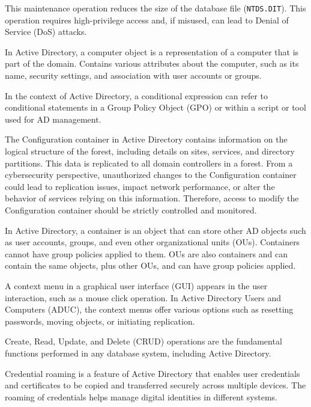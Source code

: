  This maintenance operation reduces the size of the database file (\texttt{NTDS.DIT}). This operation requires high-privilege access and, if misused, can lead to Denial of Service (DoS) attacks.

 In Active Directory, a computer object is a representation of a computer that is part of the domain. Contains various attributes about the computer, such as its name, security settings, and association with user accounts or groups.

 In the context of Active Directory, a conditional expression can refer to conditional statements in a Group Policy Object (GPO) or within a script or tool used for AD management.

 The Configuration container in Active Directory contains information on the logical structure of the forest, including details on sites, services, and directory partitions. This data is replicated to all domain controllers in a forest. From a cybersecurity perspective, unauthorized changes to the Configuration container could lead to replication issues, impact network performance, or alter the behavior of services relying on this information. Therefore, access to modify the Configuration container should be strictly controlled and monitored.

 In Active Directory, a container is an object that can store other AD objects such as user accounts, groups, and even other organizational units (OUs). Containers cannot have group policies applied to them. OUs are also containers and can contain the same objects, plus other OUs, and can have group policies applied.

 A context menu in a graphical user interface (GUI) appears in the user interaction, such as a mouse click operation. In Active Directory Users and Computers (ADUC), the context menus offer various options such as resetting passwords, moving objects, or initiating replication.

 Create, Read, Update, and Delete (CRUD) operations are the fundamental functions performed in any database system, including Active Directory.

 Credential roaming is a feature of Active Directory that enables user credentials and certificates to be copied and transferred securely across multiple devices. The roaming of credentials helps manage digital identities in different systems.

